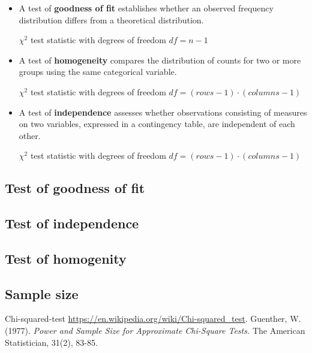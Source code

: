 \documentclass{article}
\begin{document}
\begin{itemize}
    \item A test of \textbf{goodness of fit} establishes whether an observed frequency 
    distribution differs from a theoretical distribution.

    $\chi^2$ test statistic with degrees of freedom $df=n-1$
    \item A test of \textbf{homogeneity} compares the distribution of counts for 
    two or more groups using the same categorical variable.

    $\chi^2$ test statistic with degrees of freedom $df=(rows-1)\cdot(columns-1)$
    \item A test of \textbf{independence} assesses whether observations consisting of 
    measures on two variables, expressed in a contingency table, are independent of each other.
    
    $\chi^2$ test statistic with degrees of freedom $df=(rows-1)\cdot(columns-1)$
\end{itemize}



\subsection{Test of goodness of fit}

\subsection{Test of independence}

\subsection{Test of homogenity}

\subsection{Sample size}


\begin{thebibliography}{9}
    Chi-squared-test 
    \url{https://en.wikipedia.org/wiki/Chi-squared\_test}.
    Guenther, W. (1977). 
    \textit{Power and Sample Size for Approximate Chi-Square Tests.} 
    The American Statistician, 31(2), 83-85.

\end{thebibliography}   
\end{document}
